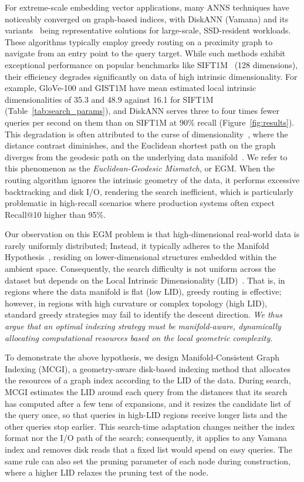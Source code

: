 \documentclass{article}
\theoremstyle{plain}
\theoremstyle{definition}
\theoremstyle{remark}
\begin{document}
For extreme-scale embedding vector applications, many ANNS techniques have noticeably converged on graph-based indices, with DiskANN (Vamana) and its variants~\cite{subramanya2019diskann,osdi25pipeann,fast26odinann} being representative solutions for large-scale, SSD-resident workloads. These algorithms typically employ greedy routing on a proximity graph to navigate from an entry point to the query target. While such methods exhibit exceptional performance on popular benchmarks like SIFT1M~\cite{jegou2011product} (128 dimensions), their efficiency degrades significantly on data of high intrinsic dimensionality. For example, GloVe-100 and GIST1M have mean estimated local intrinsic dimensionalities of 35.3 and 48.9 against 16.1 for SIFT1M (Table~\ref{tab:search_params}), and DiskANN serves three to four times fewer queries per second on them than on SIFT1M at 90\% recall (Figure~\ref{fig:results}). This degradation is often attributed to the curse of dimensionality~\cite{bellman1957dynamic}, where the distance contrast diminishes, and the Euclidean shortest path on the graph diverges from the geodesic path on the underlying data manifold~\cite{tenenbaum2000global,NEURIPS2023_d0ac28b7}. We refer to this phenomenon as the \emph{Euclidean-Geodesic Mismatch}, or EGM. When the routing algorithm ignores the intrinsic geometry of the data, it performs excessive backtracking and disk I/O, rendering the search inefficient, which is particularly problematic in high-recall scenarios where production systems often expect Recall@10 higher than 95\%.

Our observation on this EGM problem is that high-dimensional real-world data is rarely uniformly distributed; Instead, it typically adheres to the Manifold Hypothesis~\cite{tenenbaum2000global,roweis2000nonlinear}, residing on lower-dimensional structures embedded within the ambient space. Consequently, the search difficulty is not uniform across the dataset but depends on the Local Intrinsic Dimensionality (LID)~\cite{NIPS2004_74934548}. That is, in regions where the data manifold is flat (low LID), greedy routing is effective; however, in regions with high curvature or complex topology (high LID), standard greedy strategies may fail to identify the descent direction. 
\emph{We thus argue that an optimal indexing strategy must be manifold-aware, dynamically allocating computational resources based on the local geometric complexity.}

To demonstrate the above hypothesis, we design Manifold-Consistent Graph Indexing (MCGI), a geometry-aware disk-based indexing method that allocates the resources of a graph index according to the LID of the data. During search, MCGI estimates the LID around each query from the distances that its search has computed after a few tens of expansions, and it resizes the candidate list of the query once, so that queries in high-LID regions receive longer lists and the other queries stop earlier. This search-time adaptation changes neither the index format nor the I/O path of the search; consequently, it applies to any Vamana index and removes disk reads that a fixed list would spend on easy queries. The same rule can also set the pruning parameter of each node during construction, where a higher LID relaxes the pruning test of the node. 
\end{document}
